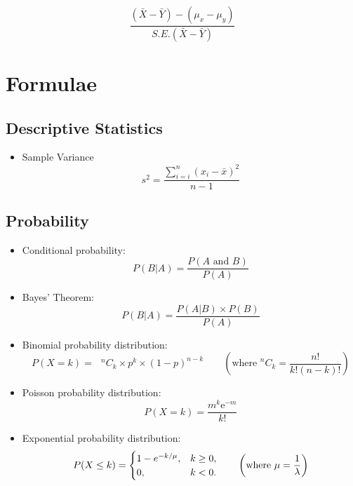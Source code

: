 		\begin{equation}
		\frac{(\bar{X}-\bar{Y})-(\mu_{x}-\mu_{y})}{S.E.(\bar{X}-\bar{Y})}
		\end{equation}
		
		
		
		\newpage
\section*{Formulae}
\subsection*{Descriptive Statistics}
\begin{itemize}
\item Sample Variance
\begin{equation*}
s^2 = \frac{\sum^{n}_{i=i} (x_i-\bar{x})^2}{n-1}
\end{equation*}
\end{itemize}
\subsection*{Probability}
\begin{itemize}

\item Conditional probability:
\begin{equation*}
P(B|A)=\frac{P\left( A\text{ and }B\right) }{P\left( A\right) }
\end{equation*}


\item Bayes' Theorem:
\begin{equation*}
P(B|A)=\frac{P\left(A|B\right) \times P(B) }{P\left( A\right) }
\end{equation*}





\item Binomial probability distribution:
\begin{equation*}
P(X = k) = \text{  }^{n}C_{k} \times p^{k} \times \left( 1-p\right) ^{n-k}\qquad \left( \text{where  }
^{n}C_{k} =\frac{n!}{k!\left(n-k\right) !} \right)
\end{equation*}

\item Poisson probability distribution:
\begin{equation*}
P(X = k) =\frac{m^{k}\mathrm{e}^{-m}}{k!}
\end{equation*}

\item Exponential probability distribution:
\begin{equation*}
P(X \leq k) = \begin{cases}
1-e^{- k/\mu}, & k \ge 0, \\
0, & k < 0.
\end{cases}\qquad \left( \text{where  }
\mu = {1\over \lambda}\right)
\end{equation*}
\end{itemize}

